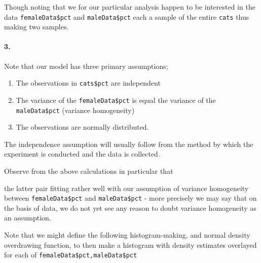 \documentclass[
]{article}
\newenvironment{Shaded}{\begin{snugshade}}{\end{snugshade}}
\newcommand{\CommentTok}[1]{\textcolor[rgb]{0.56,0.35,0.01}{\textit{#1}}}
\newcommand{\KeywordTok}[1]{\textcolor[rgb]{0.13,0.29,0.53}{\textbf{#1}}}
\newcommand{\NormalTok}[1]{#1}
\newcommand{\OperatorTok}[1]{\textcolor[rgb]{0.81,0.36,0.00}{\textbf{#1}}}
\begin{document}
Though noting that we for our particular analysis happen to be
interested in the data \texttt{femaleData\$pct} and
\texttt{maleData\$pct} each a sample of the entire \texttt{cats} thus
making two samples.

\hypertarget{section-11}{%
\paragraph{\texorpdfstring{\textbf{3.}}{3.}}\label{section-11}}

Note that our model has three primary assumptions;

\begin{enumerate}
\def\labelenumi{\arabic{enumi}.}
\item
  The observations in \texttt{cats\$pct} are independent
\item
  The variance of the \texttt{femaleData\$pct} is equal the variance of
  the \texttt{maleData\$pct} (variance homogeneity)
\item
  The observations are normally distributed.
\end{enumerate}

The independence assumption will usually follow from the method by which
the experiment is conducted and the data is collected.

Observe from the above calculations in particular that

\begin{Shaded}
\end{Shaded}

the latter pair fitting rather well with our assumption of variance
homogeneity between \texttt{femaleData\$pct} and \texttt{maleData\$pct}
- more precisely we may say that on the basis of data, we do not yet see
any reason to doubt variance homogeneity as an assumption.

Note that we might define the following histogram-making, and normal
density overdrawing function, to then make a histogram with density
estimates overlayed for each of \texttt{femaleData\$pct,maleData\$pct}
\end{document}
